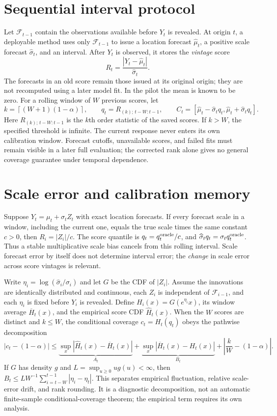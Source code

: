 \documentclass[11pt]{article}
\begin{document}
\section{Sequential interval protocol}
Let $\mathcal F_{t-1}$ contain the observations available before $Y_t$ is
revealed. At origin $t$, a deployable method uses only $\mathcal F_{t-1}$ to
issue a location forecast $\widehat\mu_t$, a positive scale forecast
$\widehat\sigma_t$, and an interval. After $Y_t$ is observed, it stores the
\emph{vintage} score
\[
 R_t=\frac{|Y_t-\widehat\mu_t|}{\widehat\sigma_t}.
\]
The forecasts in an old score remain those issued at its original origin;
they are not recomputed using a later model fit. In the pilot the mean is
known to be zero. For a rolling window of $W$ previous scores, let
\[
 k=\left\lceil(W+1)(1-\alpha)\right\rceil,\qquad
 q_t=R_{(k);\,t-W:t-1},\qquad
 C_t=[\widehat\mu_t-\widehat\sigma_t q_t,
      \widehat\mu_t+\widehat\sigma_t q_t].
\]
Here $R_{(k);\,t-W:t-1}$ is the $k$th order statistic of the saved scores.
If $k>W$, the specified threshold is infinite. The current response never
enters its own calibration window. Forecast cutoffs, unavailable scores, and
failed fits must remain visible in a later full evaluation; the corrected
rank alone gives no general coverage guarantee under temporal dependence.

\section{Scale error and calibration memory}
Suppose $Y_t=\mu_t+\sigma_t Z_t$ with exact location forecasts. If every
forecast scale in a window, including the current one, equals the true scale
times the same constant $c>0$, then $R_i=|Z_i|/c$. The score quantile is
$q_t=q_t^{\rm oracle}/c$, and
$\widehat\sigma_tq_t=\sigma_tq_t^{\rm oracle}$.
Thus a stable multiplicative scale bias cancels from this rolling interval.
Scale forecast error by itself does not determine interval error; the
\emph{change} in scale error across score vintages is relevant.

Write $\eta_i=\log(\widehat\sigma_i/\sigma_i)$ and let $G$ be the CDF of
$|Z_i|$. Assume the innovations are identically distributed and continuous,
each $Z_i$ is independent of $\mathcal F_{i-1}$, and each $\eta_i$ is fixed
before $Y_i$ is revealed. Define
$H_i(x)=G(e^{\eta_i}x)$, its window average $\overline H_t(x)$, and the
empirical score CDF $\widehat H_t(x)$. When the $W$ scores are distinct and
$k\leq W$, the conditional coverage $c_t=H_t(q_t)$ obeys the pathwise
decomposition
\[
 |c_t-(1-\alpha)|\leq
 \underbrace{\sup_x|\widehat H_t(x)-\overline H_t(x)|}_{A_t}
 +\underbrace{\sup_x|\overline H_t(x)-H_t(x)|}_{B_t}
 +\left|\frac{k}{W}-(1-\alpha)\right|.
\]
If $G$ has density $g$ and $L=\sup_{u\geq0}ug(u)<\infty$, then
$B_t\leq L W^{-1}\sum_{i=t-W}^{t-1}|\eta_i-\eta_t|$.
This separates empirical fluctuation, relative scale-error drift, and rank
rounding. It is a diagnostic decomposition, not an automatic finite-sample
conditional-coverage theorem; the empirical term requires its own analysis.
\end{document}
